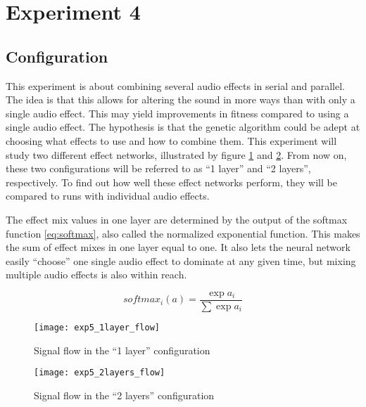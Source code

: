 \section{Experiment 4} %

\subsection{Configuration}
This experiment is about combining several audio effects in serial and parallel. The idea is that this allows for altering the sound in more ways than with only a single audio effect. This may yield improvements in fitness compared to using a single audio effect. The hypothesis is that the genetic algorithm could be adept at choosing what effects to use and how to combine them. This experiment will study two different effect networks, illustrated by figure \ref{fig:exp5_1layer_flow} and \ref{fig:exp5_2layers_flow}. From now on, these two configurations will be referred to as ``1 layer'' and ``2 layers'', respectively. To find out how well these effect networks perform, they will be compared to runs with individual audio effects.

The effect mix values in one layer are determined by the output of the softmax function \eqref{eq:softmax}, also called the normalized exponential function. This makes the sum of effect mixes in one layer equal to one. It also lets the neural network easily ``choose'' one single audio effect to dominate at any given time, but mixing multiple audio effects is also within reach.

\begin{equation} \label{eq:softmax}
softmax_i(a)=\frac{\exp{a_i}}{\sum\exp{a_i}}
\end{equation}

\begin{figure}[H]
    \centering
    \texttt{[image: exp5\_1layer\_flow]}
    \caption{Signal flow in the ``1 layer'' configuration}
    \label{fig:exp5_1layer_flow}
\end{figure}

\begin{figure}[H]
    \centering
    \texttt{[image: exp5\_2layers\_flow]}
    \caption{Signal flow in the ``2 layers'' configuration}
    \label{fig:exp5_2layers_flow}
\end{figure}

